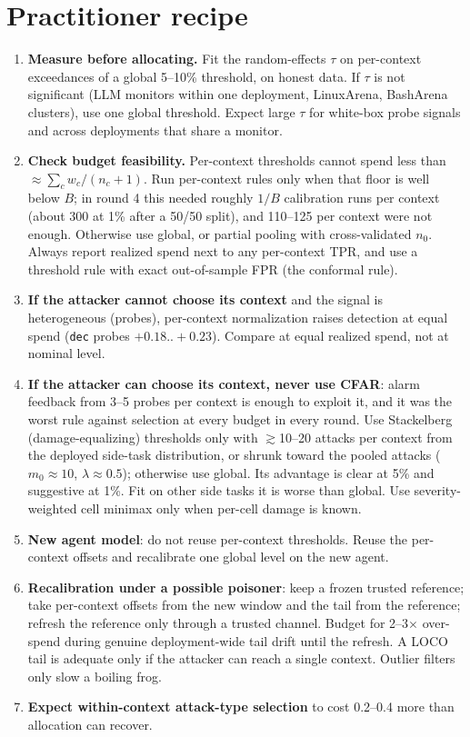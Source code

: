 \documentclass[11pt]{article}
\begin{document}
\section{Practitioner recipe}
\begin{enumerate}
\item \textbf{Measure before allocating.} Fit the random-effects $\tau$ on per-context exceedances of a global 5--10\% threshold, on honest data. If $\tau$ is not significant (LLM monitors within one deployment, LinuxArena, BashArena clusters), use one global threshold. Expect large $\tau$ for white-box probe signals and across deployments that share a monitor.
\item \textbf{Check budget feasibility.} Per-context thresholds cannot spend less than $\approx\sum_c w_c/(n_c+1)$. Run per-context rules only when that floor is well below $B$; in round 4 this needed roughly $1/B$ calibration runs per context (about 300 at 1\% after a 50/50 split), and 110--125 per context were not enough. Otherwise use global, or partial pooling with cross-validated $n_0$. Always report realized spend next to any per-context TPR, and use a threshold rule with exact out-of-sample FPR (the conformal rule).
\item \textbf{If the attacker cannot choose its context} and the signal is heterogeneous (probes), per-context normalization raises detection at equal spend (\texttt{dec} probes $+0.18..+0.23$). Compare at equal realized spend, not at nominal level.
\item \textbf{If the attacker can choose its context, never use CFAR}: alarm feedback from 3--5 probes per context is enough to exploit it, and it was the worst rule against selection at every budget in every round. Use Stackelberg (damage-equalizing) thresholds only with $\gtrsim$10--20 attacks per context from the deployed side-task distribution, or shrunk toward the pooled attacks ($m_0\approx10$, $\lambda\approx0.5$); otherwise use global. Its advantage is clear at 5\% and suggestive at 1\%. Fit on other side tasks it is worse than global. Use severity-weighted cell minimax only when per-cell damage is known.
\item \textbf{New agent model}: do not reuse per-context thresholds. Reuse the per-context offsets and recalibrate one global level on the new agent.
\item \textbf{Recalibration under a possible poisoner}: keep a frozen trusted reference; take per-context offsets from the new window and the tail from the reference; refresh the reference only through a trusted channel. Budget for 2--3$\times$ over-spend during genuine deployment-wide tail drift until the refresh. A LOCO tail is adequate only if the attacker can reach a single context. Outlier filters only slow a boiling frog.
\item \textbf{Expect within-context attack-type selection} to cost 0.2--0.4 more than allocation can recover.
\end{enumerate}
\end{document}
